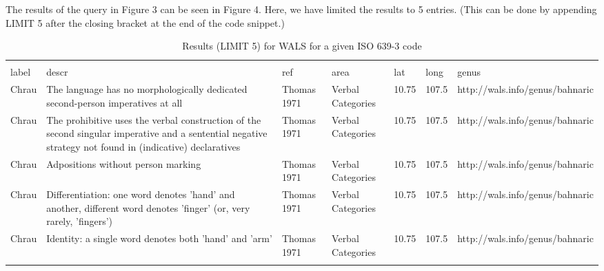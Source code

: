 The results of the query in Figure 3 can be seen in Figure 4. Here, we have limited the results to 5 entries. (This can be done by appending LIMIT 5 after the closing bracket at the end of the code snippet.) 

\begin{table*}
\caption{Results (LIMIT 5) for WALS for a given ISO 639-3 code} \label{t1}
\begin{tabular}{p{.5cm}p{4cm}p{2cm}p{2cm}p{.5cm}p{.5cm}p{3.5cm}}
\hline
& & & & & & \\
label & descr &ref & area & lat & long &genus \\
Chrau & The language has no morphologically dedicated second-person imperatives at all&Thomas 1971 & Verbal Categories&10.75&107.5&http://wals.info/genus/bahnaric\\
Chrau &The prohibitive uses the verbal construction of the second singular imperative and a sentential negative strategy not found in (indicative) declaratives&Thomas 1971&Verbal Categories&10.75&107.5&http://wals.info/genus/bahnaric \\
Chrau&Adpositions without person marking&Thomas 1971&Verbal Categories&10.75&107.5&http://wals.info/genus/bahnaric \\
Chrau&Differentiation: one word denotes 'hand' and another, different word denotes 'finger' (or, very rarely, 'fingers')&Thomas 1971&Verbal Categories&10.75&107.5&http://wals.info/genus/bahnaric \\
Chrau&Identity: a single word denotes both 'hand' and 'arm'&Thomas 1971&Verbal Categories&10.75&107.5&http://wals.info/genus/bahnaric \\
& & & & & & \\
\hline
\end{tabular}
\end{table*}



